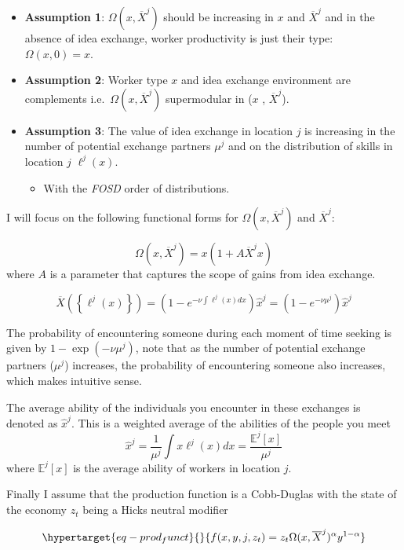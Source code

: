 \documentclass[
  letterpaper,
  DIV=11,
  numbers=noendperiod]{scrreprt}
\providecommand{\tightlist}{%
  \setlength{\itemsep}{0pt}\setlength{\parskip}{0pt}}\usepackage{longtable,booktabs,array}
\begin{document}
\begin{itemize}
\tightlist
\item
  \textbf{Assumption 1}: \(\Omega(x, \overline{X}^j)\) should be
  increasing in \(x\) and \(\overline{X}^j\) and in the absence of idea
  exchange, worker productivity is just their type:
  \(\Omega(x, 0) = x\).
\item
  \textbf{Assumption 2}: Worker type \(x\) and idea exchange environment
  are complements i.e.~\(\Omega(x, \overline{X}^j)\) supermodular in
  (\(x\) , \(\overline{X}^j\)).
\item
  \textbf{Assumption 3}: The value of idea exchange in location \(j\) is
  increasing in the number of potential exchange partners \(\mu^j\) and
  on the distribution of skills in location \(j\) \(\ell^j(x)\).

  \begin{itemize}
  \tightlist
  \item
    With the \emph{FOSD} order of distributions.
  \end{itemize}
\end{itemize}

I will focus on the following functional forms for
\(\Omega(x, \overline{X}^j)\) and \(\overline{X}^j\):

\[\Omega(x, \overline{X}^j) = x(1 + A \overline{X}^j x)\] where \(A\) is
a parameter that captures the scope of gains from idea exchange.

\[
    \overline{X}\left(\left\{\ell^j(x)\right\}\right) = \left(1 - e^{-\nu \int \ell^j(x) dx}\right)\hat{x}^j =\left(1 - e^{-\nu \mu^j} \right)\hat{x}^j
\]

The probability of encountering someone during each moment of time
seeking is given by \(1 - \exp(-ν \mu^j)\), note that as the number of
potential exchange partners (\(\mu^j\)) increases, the probability of
encountering someone also increases, which makes intuitive sense.

The average ability of the individuals you encounter in these exchanges
is denoted as \(\hat{x}^j\). This is a weighted average of the abilities
of the people you meet
\[\hat{x}^j = \frac{1}{\mu^j}\int{x\ell^j(x)dx}=\frac{\mathbb{E}^j[x]}{\mu^j}\]
where \(\mathbb{E}^j[x]\) is the average ability of workers in location
\(j\).

Finally I assume that the production function is a Cobb-Duglas with the
state of the economy \(z_t\) being a Hicks neutral modifier

\begin{equation}\protect\hypertarget{eq-prod_funct}{}{
f(x,y,j,z_t) = z_t \Omega(x,\overline{X}^j)^\alpha y^{1-\alpha}
}\label{eq-prod_funct}\end{equation}
\end{document}
